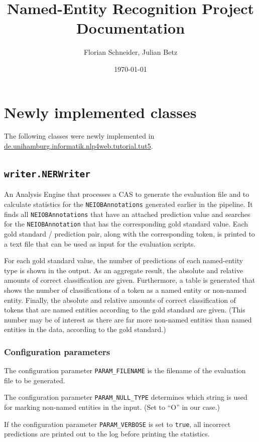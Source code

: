 \documentclass[11pt, english]{article}
\title{Named-Entity Recognition Project\\Documentation}
\author{Florian Schneider, Julian Betz}
\date{\today}
\begin{document}
\maketitle

\pagestyle{mainmatter}

\section{Newly implemented classes}
The following classes were newly implemented in \url{de.unihamburg.informatik.nlp4web.tutorial.tut5}.

\subsection{\texttt{writer.NERWriter}}
An Analysis Engine that processes a CAS to generate the evaluation file and to calculate statistics for the \verb/NEIOBAnnotations/ generated earlier in the pipeline.
It finds all \verb/NEIOBAnnotations/ that have an attached prediction value and searches for the \verb/NEIOBAnnotation/ that has the corresponding gold standard value.
Each gold standard / prediction pair, along with the corresponding token, is printed to a text file that can be used as input for the evaluation scripts.

For each gold standard value, the number of predictions of each named-entity type is shown in the output.
As an aggregate result, the absolute and relative amounts of correct classification are given.
Furthermore, a table is generated that shows the number of classifications of a token as a named entity or non-named entity.
Finally, the absolute and relative amounts of correct classification of tokens that are named entities according to the gold standard are given.
(This number may be of interest as there are far more non-named entities than named entities in the data, according to the gold standard.)

\subsubsection{Configuration parameters}
The configuration parameter \verb/PARAM_FILENAME/ is the filename of the evaluation file to be generated.

The configuration parameter \verb/PARAM_NULL_TYPE/ determines which string is used for marking non-named entities in the input.
(Set to ``O'' in our case.)

If the configuration parameter \verb/PARAM_VERBOSE/ is set to \verb/true/, all incorrect predictions are printed out to the log before printing the statistics.
\end{document}

